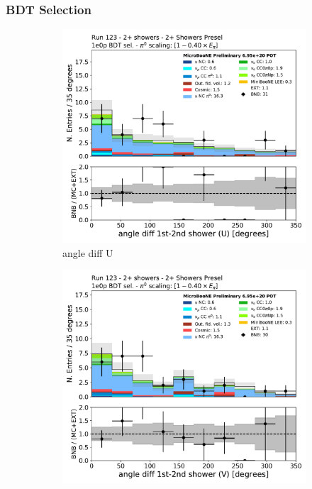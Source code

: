 \subsubsection{\zpsel BDT Selection}
\begin{figure}[H]
    \centering
    \begin{subfigure}{0.3\textwidth}
    \includegraphics[width=1.0\textwidth]{Sidebands/Figures/TwoShr_1e0pSel/BDT/anglediff_U.pdf}
    \caption{angle diff U}
    \end{subfigure}
    \begin{subfigure}{0.3\textwidth}
    \includegraphics[width=1.0\textwidth]{Sidebands/Figures/TwoShr_1e0pSel/BDT/anglediff_V.pdf}

\end{subfigure}
\end{figure}
